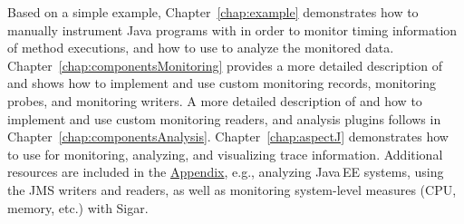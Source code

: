 Based on a simple example, Chapter~\ref{chap:example} demonstrates %
how to manually instrument Java programs with \KiekerMonitoringPart{} %
in order to monitor timing information of method executions, and %
how to use \KiekerAnalysisPart{} to analyze the monitored data. %
Chapter~\ref{chap:componentsMonitoring} provides a more detailed %
description of \KiekerMonitoringPart{} and shows how to implement and %
use custom monitoring records, monitoring probes, and monitoring writers. %
A more detailed description of \KiekerAnalysisPart{} and how to implement and use %
custom monitoring readers, and analysis plugins follows in %
Chapter~\ref{chap:componentsAnalysis}. %
Chapter~\ref{chap:aspectJ} demonstrates how to use \KiekerTraceAnalysis{} %
for monitoring, analyzing, and visualizing trace information. %
Additional resources are included in the \hyperlink{hypertarget:appendix}{Appendix}, %
e.g., analyzing Java\,EE systems, using the JMS writers and readers, %
as well as monitoring system-level measures (CPU, memory, etc.) with %
Sigar. %

\vspace{1cm}




